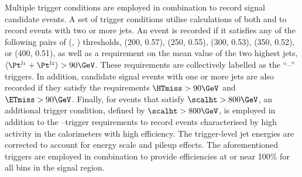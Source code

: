 

Multiple trigger conditions are employed in combination to record
signal candidate events. A set of trigger conditions utilise
calculations of both \scalht and \alphat to record events with two or
more jets. An event is recorded if it satisfies any of the following
pairs of (\scalht [GeV], \alphat) thresholds, (200, 0.57), (250,
0.55), (300, 0.53), (350, 0.52), or (400, 0.51), as well as a
requirement on the mean value of the two highest \Pt jets,
$\langle\Pt^{\mathrm{j_1}} + \Pt^{\mathrm{j_2}}\rangle >
90\GeV$. These requirements are collectively labelled as the
``\scalht--\alphat'' triggers. In addition, candidate signal events
with one or more jets are also recorded if they satisfy the
requirements $\HTmiss > 90\GeV$ and $\ETmiss > 90\GeV$. Finally, for
events that satisfy $\scalht > 800\GeV$, an additional trigger
condition, defined by $\scalht > 800\GeV$, is employed in addition to
the \scalht--\alphat trigger requirements to record events
characterised by high activity in the calorimeters with high
efficiency. The trigger-level jet energies are corrected to account
for energy scale and pileup effects. The aforementioned triggers are
employed in combination to provide efficiencies at or near 100\% for
all bins in the signal region.

